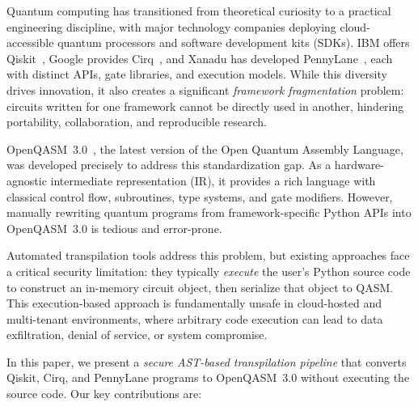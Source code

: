 \documentclass[conference]{IEEEtran}
\begin{document}
Quantum computing has transitioned from theoretical curiosity to a practical engineering discipline, with major technology companies deploying cloud-accessible quantum processors and software development kits (SDKs). IBM offers Qiskit~\cite{qiskit2024}, Google provides Cirq~\cite{cirq2024}, and Xanadu has developed PennyLane~\cite{pennylane2024}, each with distinct APIs, gate libraries, and execution models. While this diversity drives innovation, it also creates a significant \emph{framework fragmentation} problem: circuits written for one framework cannot be directly used in another, hindering portability, collaboration, and reproducible research.

OpenQASM~3.0~\cite{cross2022openqasm}, the latest version of the Open Quantum Assembly Language, was developed precisely to address this standardization gap. As a hardware-agnostic intermediate representation (IR), it provides a rich language with classical control flow, subroutines, type systems, and gate modifiers. However, manually rewriting quantum programs from framework-specific Python APIs into OpenQASM~3.0 is tedious and error-prone.

Automated transpilation tools address this problem, but existing approaches face a critical security limitation: they typically \emph{execute} the user's Python source code to construct an in-memory circuit object, then serialize that object to QASM. This execution-based approach is fundamentally unsafe in cloud-hosted and multi-tenant environments, where arbitrary code execution can lead to data exfiltration, denial of service, or system compromise.

In this paper, we present a \emph{secure AST-based transpilation pipeline} that converts Qiskit, Cirq, and PennyLane programs to OpenQASM~3.0 without executing the source code. Our key contributions are:
\end{document}
